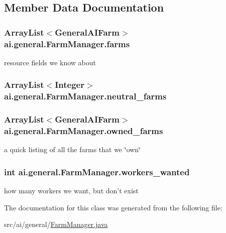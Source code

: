 \subsection{Member Data Documentation}
\hypertarget{classai_1_1general_1_1_farm_manager_a9bd738ced9a1940305e484ed9454f1c7}{
\subsubsection[{farms}]{\setlength{\rightskip}{0pt plus 5cm}ArrayList$<${\bf GeneralAIFarm}$>$ {\bf ai.general.FarmManager.farms}}}
\label{classai_1_1general_1_1_farm_manager_a9bd738ced9a1940305e484ed9454f1c7}
resource fields we know about \hypertarget{classai_1_1general_1_1_farm_manager_a7fbfff2fdadbb3fbdeeeaeb62cd5496c}{
\subsubsection[{neutral\_\-farms}]{\setlength{\rightskip}{0pt plus 5cm}ArrayList$<$Integer$>$ {\bf ai.general.FarmManager.neutral\_\-farms}}}
\label{classai_1_1general_1_1_farm_manager_a7fbfff2fdadbb3fbdeeeaeb62cd5496c}
\hypertarget{classai_1_1general_1_1_farm_manager_a4127471edad7fccfb34addaf6041da88}{
\subsubsection[{owned\_\-farms}]{\setlength{\rightskip}{0pt plus 5cm}ArrayList$<${\bf GeneralAIFarm}$>$ {\bf ai.general.FarmManager.owned\_\-farms}}}
\label{classai_1_1general_1_1_farm_manager_a4127471edad7fccfb34addaf6041da88}
a quick listing of all the farms that we \char`\"{}own\char`\"{} \hypertarget{classai_1_1general_1_1_farm_manager_aaf0202404f88cdfabebee5bc6d07753f}{
\subsubsection[{workers\_\-wanted}]{\setlength{\rightskip}{0pt plus 5cm}int {\bf ai.general.FarmManager.workers\_\-wanted}}}
\label{classai_1_1general_1_1_farm_manager_aaf0202404f88cdfabebee5bc6d07753f}
how many workers we want, but don't exist 

The documentation for this class was generated from the following file:\begin{DoxyCompactItemize}
\item 
src/ai/general/\hyperlink{_farm_manager_8java}{FarmManager.java}\end{DoxyCompactItemize}
